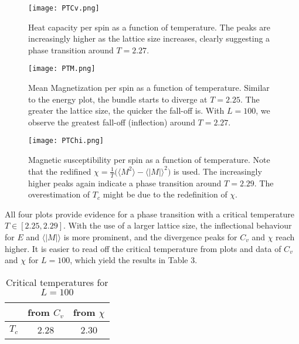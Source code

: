 \documentclass{article}
\begin{document}
\begin{figure}[h]
\begin{center}
\texttt{[image: PTCv.png]}
\caption{Heat capacity per spin as a function of temperature. The peaks are increasingly higher as the lattice size increases, clearly suggesting a phase transition around $T=2.27$.}
\end{center}
\end{figure}

\begin{figure}[H]
\begin{center}
\texttt{[image: PTM.png]}
\caption{Mean Magnetization per spin as a function of temperature. Similar to the energy plot, the bundle starts to diverge at $T=2.25$. The greater the lattice size, the quicker the fall-off is. With $L=100$, we observe the greatest fall-off (inflection) around $T=2.27$. }
\end{center}
\end{figure}

\begin{figure}[H]
\begin{center}
\texttt{[image: PTChi.png]}
\caption{Magnetic susceptibility per spin as a function of temperature. Note that the redifined $\chi = \frac{1}{T} \big( \langle M^2\rangle - \langle|M|\rangle^2\big)$ is used. The increasingly higher peaks again indicate a phase transition around $T=2.29$. The overestimation of $T_c$ might be due to the redefinition of $\chi$.}
\end{center}
\end{figure}

All four plots provide evidence for a phase transition with a critical temperature $T \in [2.25, 2.29]$. With the use of a larger lattice size, the inflectional behaviour for $E$ and $\langle|M|\rangle$ is more prominent, and the divergence peaks for $C_v$ and $\chi$ reach higher. It is easier to read off the critical temperature from plots and data of $C_v$ and $\chi$ for $L=100$, which yield the results in Table 3.

\begin{table}[ht]
\caption{Critical temperatures for $L=100$}
\centering
\begin{tabular}{c c c}
\hline\hline
 & from $C_v$ & from $\chi$ \\
 \hline
 $T_c$ & 2.28 & 2.30\\
 \hline
\end{tabular}
\end{table}
\end{document}
